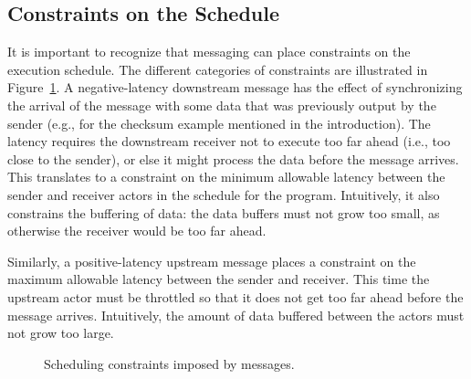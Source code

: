 \subsection{Constraints on the Schedule}
\label{sec:constraints}

It is important to recognize that messaging can place constraints on
the execution schedule.  The different categories of constraints are
illustrated in Figure~\ref{tab:messcons}.  A negative-latency
downstream message has the effect of synchronizing the arrival of the
message with some data that was previously output by the sender (e.g.,
for the checksum example mentioned in the introduction).  The latency
requires the downstream receiver not to execute too far ahead (i.e.,
too close to the sender), or else it might process the data before the
message arrives.  This translates to a constraint on the minimum
allowable latency between the sender and receiver actors in the
schedule for the program.  Intuitively, it also constrains the
buffering of data: the data buffers must not grow too small, as
otherwise the receiver would be too far ahead.

Similarly, a positive-latency upstream message places a constraint on
the maximum allowable latency between the sender and receiver.  This
time the upstream actor must be throttled so that it does not get too
far ahead before the message arrives.  Intuitively, the amount of data
buffered between the actors must not grow too large.

\begin{figure}[t]
\begin{center}
\vspace{-16pt}
\caption{\small Scheduling constraints imposed by messages.}
\label{tab:messcons}
\end{center}
\end{figure}

